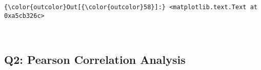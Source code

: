 \documentclass[11pt]{article}
\begin{document}
            \begin{Verbatim}[commandchars=\\\{\}]
{\color{outcolor}Out[{\color{outcolor}58}]:} <matplotlib.text.Text at 0xa5cb326c>
\end{Verbatim}
        
    \begin{center}
    \end{center}
    { \hspace*{\fill} \\}
    
    \subsection{Q2: Pearson Correlation
Analysis}\label{q2-pearson-correlation-analysis}
\end{document}

